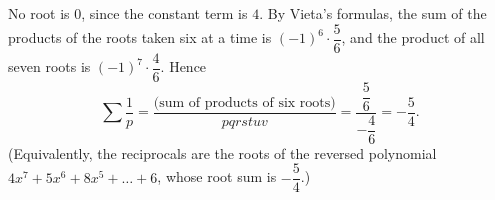 No root is $0$, since the constant term is $4$. By Vieta's formulas, the sum of the products of the roots taken six at a time is $(-1)^6\cdot\dfrac{5}{6}$, and the product of all seven roots is $(-1)^7\cdot\dfrac{4}{6}$. Hence
\[
\sum\dfrac{1}{p}=\dfrac{\text{(sum of products of six roots)}}{pqrstuv}=\dfrac{\dfrac{5}{6}}{-\dfrac{4}{6}}=\boxed{-\dfrac{5}{4}}.
\]
(Equivalently, the reciprocals are the roots of the reversed polynomial $4x^7+5x^6+8x^5+\dots+6$, whose root sum is $-\dfrac{5}{4}$.)
